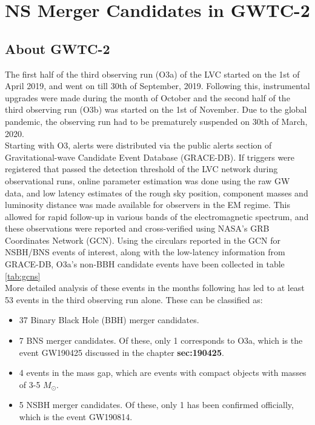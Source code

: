 \chapter{NS Merger Candidates in GWTC-2}\label{ch:candidates}

\section{About GWTC-2}

    The first half of the third observing run (O3a) of the LVC started on the 1st of
    April 2019, and went on till 30th of September, 2019.  Following this, instrumental
    upgrades were made during the month of October and the second half of the third
    observing run (O3b) was started on the 1st of November. Due to the global pandemic,
    the observing run had to be prematurely suspended on 30th of March, 2020.\\ Starting
    with O3, alerts were distributed via the public alerts section of Gravitational-wave
    Candidate Event Database (GRACE-DB). If triggers were registered that passed the
    detection threshold of the LVC network during observational runs, online parameter
    estimation was done using the raw GW data, and low latency estimates of the rough
    sky position, component masses and luminosity distance was made available for
    observers in the EM regime. This allowed for rapid follow-up in various bands of the
    electromagnetic spectrum, and these observations were reported and cross-verified
    using NASA's GRB Coordinates Network (GCN). Using the circulars reported in the GCN
    for NSBH/BNS events of interest, along with the low-latency information from
    GRACE-DB, O3a's non-BBH candidate events have been collected in table \ref{tab:gcns}
    \\ More detailed analysis of these events in the months following has led to at
    least 53 events in the third observing run alone. These can be classified as:
    \begin{itemize}

        \item 37 Binary Black Hole (BBH) merger candidates.

        \item 7 BNS merger candidates. Of these, only 1 corresponds to O3a, which is the
            event GW190425 discussed in the chapter \textbf{sec:190425}.

        \item 4 events in the mass gap, which are events with compact objects with
            masses of 3-5 $M_{\odot}$.

        \item 5 NSBH merger candidates. Of these, only 1 has been confirmed officially,
            which is the event GW190814.

    \end{itemize}


